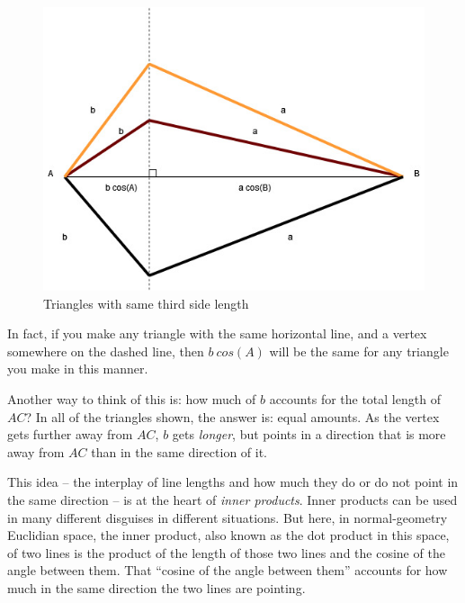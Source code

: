 \documentclass[
]{book}
\begin{document}
\begin{figure}

{\centering \includegraphics[width=0.75\linewidth,height=0.75\textheight]{images/Triangles-bcosA} 

}

\caption{Triangles with same third side length}\label{fig:unnamed-chunk-2}
\end{figure}

In fact, if you make any triangle with the same horizontal line, and a vertex somewhere on the dashed line, then \(b\ cos(A)\) will be the same for any triangle you make in this manner.

Another way to think of this is: how much of \(b\) accounts for the total length of \(AC\)? In all of the triangles shown, the answer is: equal amounts. As the vertex gets further away from \(AC\), \(b\) gets \emph{longer}, but points in a direction that is more away from \(AC\) than in the same direction of it.

This idea -- the interplay of line lengths and how much they do or do not point in the same direction -- is at the heart of \emph{inner products}. Inner products can be used in many different disguises in different situations. But here, in normal-geometry Euclidian space, the inner product, also known as the dot product in this space, of two lines is the product of the length of those two lines and the cosine of the angle between them. That ``cosine of the angle between them'' accounts for how much in the same direction the two lines are pointing.
\end{document}
